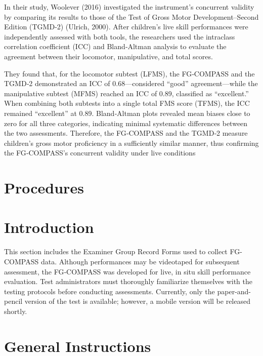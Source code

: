 \documentclass[
  letterpaper,
  DIV=11,
  numbers=noendperiod]{scrreprt}
\begin{document}
In their study, Woolever (2016) investigated the instrument's concurrent
validity by comparing its results to those of the Test of Gross Motor
Development--Second Edition (TGMD‑2) (Ulrich, 2000). After children's
live skill performances were independently assessed with both tools, the
researchers used the intraclass correlation coefficient (ICC) and
Bland‑Altman analysis to evaluate the agreement between their locomotor,
manipulative, and total scores.

They found that, for the locomotor subtest (LFMS), the FG‑COMPASS and
the TGMD‑2 demonstrated an ICC of 0.68---considered ``good''
agreement---while the manipulative subtest (MFMS) reached an ICC of
0.89, classified as ``excellent.'' When combining both subtests into a
single total FMS score (TFMS), the ICC remained ``excellent'' at 0.89.
Bland‑Altman plots revealed mean biases close to zero for all three
categories, indicating minimal systematic differences between the two
assessments. Therefore, the FG‑COMPASS and the TGMD‑2 measure children's
gross motor proficiency in a sufficiently similar manner, thus
confirming the FG‑COMPASS's concurrent validity under live conditions


\chapter{Procedures}\label{procedures}


\chapter{Introduction}\label{introduction-1}

This section includes the Examiner Group Record Forms used to collect
FG-COMPASS data. Although performances may be videotaped for subsequent
assessment, the FG‑COMPASS was developed for live, in situ skill
performance evaluation. Test administrators must thoroughly familiarize
themselves with the testing protocols before conducting assessments.
Currently, only the paper-and-pencil version of the test is available;
however, a mobile version will be released shortly.


\chapter{General Instructions}\label{general-instructions}
\end{document}
